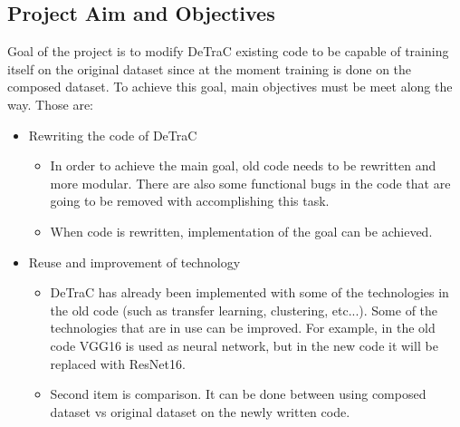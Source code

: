 \subsection{Project Aim and Objectives}
Goal of the project is to modify DeTraC existing code to be capable of training itself on the original dataset since at the moment training is done on the composed dataset.
To achieve this goal, main objectives must be meet along the way. Those are:
\begin{itemize}
 \item Rewriting the code of DeTraC
    \begin{itemize}
      \item In order to achieve the main goal, old code needs to be rewritten and more modular. There are also some functional bugs in the code that are going to be removed with accomplishing this task.
      \item When code is rewritten, implementation of the goal can be achieved.
    \end{itemize}
 \item Reuse and improvement of technology
    \begin{itemize}
      \item DeTraC has already been implemented with some of the technologies in the old code (such as transfer learning, clustering, etc...). Some of the technologies that are in use can be improved. For example, in the old code VGG16 is used as neural network, but in the new code it will be replaced with ResNet16.
      \item Second item is comparison. It can be done between using composed dataset vs original dataset on the newly written code.
    \end{itemize}
\end{itemize}

